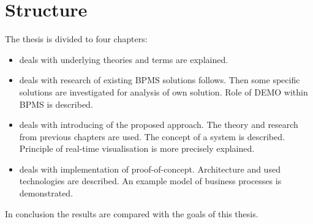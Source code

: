 \section{Structure}
The thesis is divided to four chapters:
\begin{itemize}
\item {} deals with underlying theories and terms are explained.
\item {} deals with research of existing BPMS solutions follows. Then some specific solutions are investigated for analysis of own solution. Role of DEMO within BPMS is described. 
\item {} deals with introducing of the proposed approach. The theory and research from previous chapters are used. The concept of a system is described. Principle of real-time visualisation is more precisely explained. 
\item {} deals with implementation of proof-of-concept. Architecture and used technologies are described. An example model of business processes is demonstrated.
\end{itemize}
In conclusion the results are compared with the goals of this thesis. 




